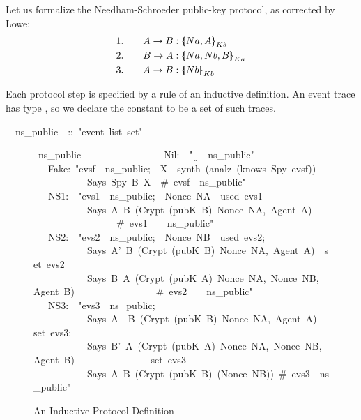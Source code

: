 Let us formalize the Needham-Schroeder public-key protocol, as corrected by
Lowe:
\begin{alignat*}{2}
  &1.&\quad  A\to B  &: \mathopen{\{\kern-.30em|} Na,A\mathclose{|\kern-.32em\}}\sb{Kb} \\
  &2.&\quad  B\to A  &: \mathopen{\{\kern-.30em|} Na,Nb,B\mathclose{|\kern-.32em\}}\sb{Ka} \\
  &3.&\quad  A\to B  &: \mathopen{\{\kern-.30em|} Nb\mathclose{|\kern-.32em\}}\sb{Kb}
\end{alignat*}

Each protocol step is specified by a rule of an inductive definition.  An
event trace has type , so we declare the constant
 to be a set of such traces.
\begin{isabelle}
\ \ ns_public\ \ ::\ "event\ list\ set"
\end{isabelle}

\begin{figure}
\begin{isabelle}
\ ns_public\isanewline
\ \ \ \isanewline
\ \ \ \ \ \ \ \ \ \isanewline
\ \ \ Nil:\ \ "[]\ \isasymin \ ns_public"\isanewline
\isanewline
\ \ \ \ \ \ \ \ \ \isanewline
\ \ \ Fake:\ "\isasymlbrakk evsf\ \isasymin \ ns_public;\ \ X\ \isasymin \ synth\ (analz\ (knows\ Spy\ evsf))\isasymrbrakk \isanewline
\ \ \ \ \ \ \ \ \ \ \isasymLongrightarrow \ Says\ Spy\ B\ X\ \ \#\ evsf\ \isasymin \ ns_public"\isanewline
\isanewline
\ \ \ \ \ \ \ \ \ \isanewline
\ \ \ NS1:\ \ "\isasymlbrakk evs1\ \isasymin \ ns_public;\ \ Nonce\ NA\ \isasymnotin \ used\ evs1\isasymrbrakk \isanewline
\ \ \ \ \ \ \ \ \ \ \isasymLongrightarrow \ Says\ A\ B\ (Crypt\ (pubK\ B)\ \isasymlbrace Nonce\ NA,\ Agent\ A\isasymrbrace )\isanewline
\ \ \ \ \ \ \ \ \ \ \ \ \ \ \ \ \ \#\ evs1\ \ \isasymin \ \ ns_public"\isanewline
\isanewline
\ \ \ \ \ \ \ \ \ \isanewline
\ \ \ NS2:\ \ "\isasymlbrakk evs2\ \isasymin \ ns_public;\ \ Nonce\ NB\ \isasymnotin \ used\ evs2;\isanewline
\ \ \ \ \ \ \ \ \ \ \ Says\ A'\ B\ (Crypt\ (pubK\ B)\ \isasymlbrace Nonce\ NA,\ Agent\ A\isasymrbrace )\ \isasymin \ set\ evs2\isasymrbrakk \isanewline
\ \ \ \ \ \ \ \ \ \ \isasymLongrightarrow \ Says\ B\ A\ (Crypt\ (pubK\ A)\ \isasymlbrace Nonce\ NA,\ Nonce\ NB,\ Agent\ B\isasymrbrace )\isanewline
\ \ \ \ \ \ \ \ \ \ \ \ \ \ \ \ \#\ evs2\ \ \isasymin \ \ ns_public"\isanewline
\isanewline
\ \ \ \ \ \ \ \ \ \isanewline
\ \ \ NS3:\ \ "\isasymlbrakk evs3\ \isasymin \ ns_public;\isanewline
\ \ \ \ \ \ \ \ \ \ \ Says\ A\ \ B\ (Crypt\ (pubK\ B)\ \isasymlbrace Nonce\ NA,\ Agent\ A\isasymrbrace )\ \isasymin \ set\ evs3;\isanewline
\ \ \ \ \ \ \ \ \ \ \ Says\ B'\ A\ (Crypt\ (pubK\ A)\ \isasymlbrace Nonce\ NA,\ Nonce\ NB,\ Agent\ B\isasymrbrace )\isanewline
\ \ \ \ \ \ \ \ \ \ \ \ \ \ \isasymin \ set\ evs3\isasymrbrakk \isanewline
\ \ \ \ \ \ \ \ \ \ \isasymLongrightarrow \ Says\ A\ B\ (Crypt\ (pubK\ B)\ (Nonce\ NB))\ \#\ evs3\ \isasymin \
ns_public"
\end{isabelle}
\caption{An Inductive Protocol Definition}\label{fig:ns_public}
\end{figure}


